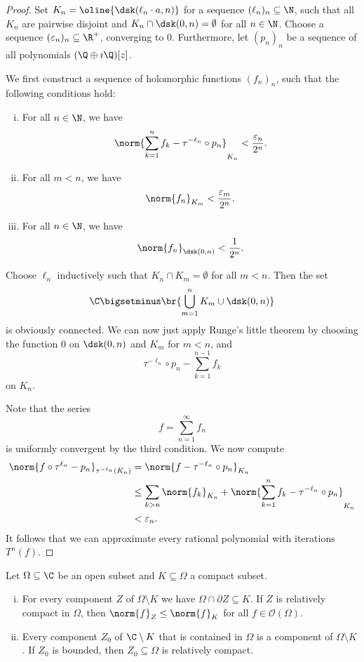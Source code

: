 \begin{proof}
Set $K_n = \oline{\dsk(\ell_n \cdot a, n)}$ for a sequence
$(\ell_n)_n \subseteq \N$, such that all $K_n$ are pairwise
disjoint and $K_n \cap \dsk(0, n) = \emptyset$ for all $n \in \N$.
Choose a sequence $(\varepsilon_n)_n \subseteq \R^+$, converging to
$0$. Furthermore, let $(p_n)_n$ be a sequence of all polynomials
$(\Q \oplus i\Q)[z]$.

We first construct a sequence of holomorphic functions $(f_n)_n$,
such that the following conditions hold:

\begin{enumerate}[i)]
\item For all $n \in \N$, we have
\[
\norm{\sum_{k=1}^n f_k - \tau^{-\ell_n} \circ p_n}_{K_n} <
\frac{\varepsilon_n}{2^n}.
\]
\item For all $m < n$, we have
\[
\norm{f_n}_{K_m} < \frac{\varepsilon_m}{2^n}.
\]
\item For all $n \in \N$, we have
\[
\norm{f_n}_{\dsk(0,n)} < \frac{1}{2^n}.
\]
\end{enumerate}

Choose $\ell_n$ inductively such that $K_n \cap K_m = \emptyset$
for all $m < n$. Then the set
\[
\C \bigsetminus \br{\bigcup_{m=1}^n K_m \cup \dsk(0,n)}
\]
is obviously connected. We can now just apply Runge's little
theorem by choosing the function $0$ on $\dsk(0,n)$ and $K_m$ for
$m < n$, and
\[
\tau^{-\ell_n} \circ p_n - \sum_{k=1}^{n-1} f_k
\]
on $K_n$.

Note that the series
\[
f = \sum_{n=1}^\infty f_n
\]
is uniformly convergent by the third condition. We now compute
\begin{align*}
\norm{f \circ \tau^{\ell_n} - p_n}_{\tau^{-\ell_n}(K_n)} &=
\norm{f - \tau^{-\ell_n} \circ p_n}_{K_n}
\\
&\leq
\sum_{k > n} \norm{f_k}_{K_n} +
\norm{\sum_{k=1}^n f_k - \tau^{-\ell_n} \circ p_n}_{K_n}
\\
&<
\varepsilon_n.
\end{align*}
It follows that we can approximate every rational polynomial with
iterations $T^n(f)$.
\end{proof}


\begin{lema}
Let $\Omega \subseteq \C$ be an open subset and
$K \subseteq \Omega$ a compact subset.

\begin{enumerate}[i)]
\item For every component $Z$ of $\Omega \setminus K$ we have
$\Omega \cap \partial{Z} \subseteq K$. If $Z$ is relatively compact
in $\Omega$, then $\norm{f}_Z \leq \norm{f}_K$ for all
$f \in \mathcal{O}(\Omega)$.
\item Every component $Z_0$ of $\C \setminus K$ that is contained
in $\Omega$ is a component of $\Omega \setminus K$. If $Z_0$ is
bounded, then $Z_0 \subseteq \Omega$ is relatively compact.
\end{enumerate}
\end{lema}


